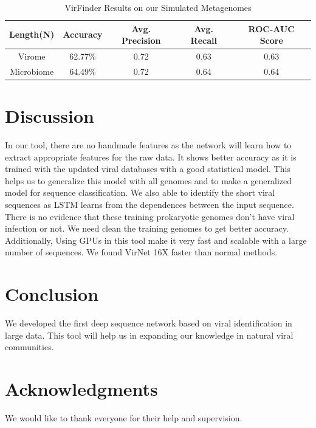 \documentclass[conference]{IEEEtran}
\begin{document}
\begin{table}[h!]
	\centering
	\begin{tabular}{||c c c c c||} 
		Length(N) &	Accuracy & Avg. Precision & Avg. Recall &	ROC-AUC Score \\ [0.5ex] 
		\hline\hline
		Virome &	62.77\%	& 0.72 & 0.63 & 0.63 \\
		Microbiome &	64.49\% &	0.72 & 0.64 & 0.64 \\ [1ex]
	\end{tabular}
	\caption{VirFinder Results on our Simulated Metagenomes}
	\label{table:virfinder_results_simulated}
\end{table}

\section{Discussion}

In our tool, there are no handmade features as the network will learn how to extract appropriate features for the raw data. It shows better accuracy as it is trained with the updated viral databases with a good statistical model. This helps us to generalize this model with all genomes and to make a generalized model for sequence classification. We also able to identify the short viral sequences as LSTM learns from the dependences between the input sequence. 
There is no evidence that these training prokaryotic genomes don't have viral infection or not. We need clean the training genomes to get better accuracy. Additionally, Using GPUs in this tool make it very fast and scalable with a large number of sequences. We found VirNet 16X faster than normal methods. 

\section{Conclusion}

We developed the first deep sequence network based on viral identification in large data. This tool will help us in expanding our knowledge in natural viral communities.

\section*{Acknowledgments}

We would like to thank everyone for their help and supervision.




\end{document}
